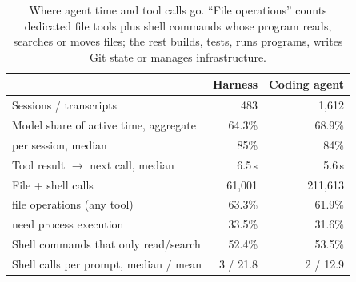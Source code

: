 \documentclass[letterpaper,twocolumn,10pt]{article}
\begin{document}
\begin{table}[t]
\centering
\small
\setlength{\tabcolsep}{3pt}
\begin{tabular}{l r r}
\toprule
& Harness & Coding agent \\
\midrule
Sessions / transcripts & 483 & 1,612 \\
Model share of active time, aggregate & 64.3\% & 68.9\% \\
\quad per session, median & 85\% & 84\% \\
Tool result $\rightarrow$ next call, median & 6.5\,s & 5.6\,s \\
File + shell calls & 61,001 & 211,613 \\
\quad file operations (any tool) & 63.3\% & 61.9\% \\
\quad need process execution & 33.5\% & 31.6\% \\
Shell commands that only read/search & 52.4\% & 53.5\% \\
Shell calls per prompt, median / mean & 3 / 21.8 & 2 / 12.9 \\
\bottomrule
\end{tabular}
\caption{Where agent time and tool calls go. ``File operations'' counts
dedicated file tools plus shell commands whose program reads, searches or
moves files; the rest builds, tests, runs programs, writes Git state or
manages infrastructure.}
\label{tab:premise}
\end{table}
\end{document}
